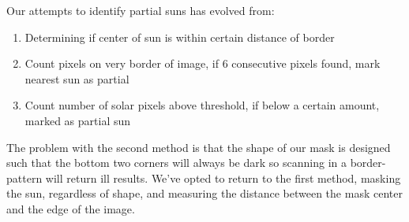 \documentclass[10pt]{scrartcl}
\begin{document}
Our attempts to identify partial suns has evolved from:

\begin{enumerate}
    \item Determining if center of sun is within certain distance of border
    \item Count pixels on very border of image, if 6 consecutive pixels found, mark nearest sun as partial
    \item Count number of solar pixels above threshold, if below a certain amount, marked as partial sun
\end{enumerate}

The problem with the second method is that the shape of our mask is designed such that the bottom two corners will always be dark so scanning in a border-pattern will return ill results. We've opted to return to the first method, masking the sun, regardless of shape, and measuring the distance between the mask center and the edge of the image. 
\end{document}
